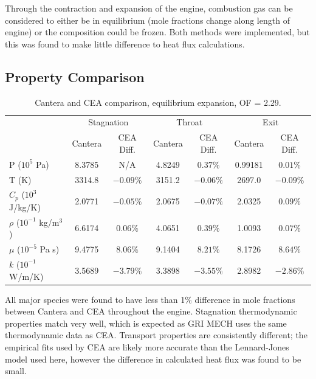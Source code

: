 \documentclass[11pt]{article}
\begin{document}
Through the contraction and expansion of the engine, combustion gas can be considered to either be in equilibrium (mole fractions change along length of engine) or the composition could be frozen. Both methods were implemented, but this was found to make little difference to heat flux calculations.


\subsection{Property Comparison}


\begin{table}[H]
  \centering
  \caption{Cantera and CEA comparison, equilibrium expansion, OF = 2.29.}
  \begin{tabular}{l c c c c c c}
    \toprule
    & \multicolumn{2}{c}{Stagnation} & \multicolumn{2}{c}{Throat} & \multicolumn{2}{c}{Exit} \\
    \cmidrule(lr){2-3} \cmidrule(lr){4-5} \cmidrule(lr){6-7}
    & Cantera & CEA Diff. & Cantera & CEA Diff. & Cantera & CEA Diff. \\
    \midrule
    P ($10^5$ Pa) & 8.3785 & N/A & 4.8249 & $0.37\%$ & 0.99181 & $0.01\%$ \\
    T (K) & 3314.8 & $-0.09\%$ & 3151.2 & $-0.06\%$ & 2697.0 & $-0.09\%$ \\
    $C_p$ ($10^3$ J/kg/K) & 2.0771 & $-0.05\%$ & 2.0675 & $-0.07\%$ & 2.0325 & $0.09\%$ \\
    $\rho$ ($10^{-1}$ kg/m$^3$) & 6.6174 & $0.06\%$ & 4.0651 & $0.39\%$ & 1.0093 & $0.07\%$\\
    $\mu$ ($10^{-5}$ Pa s) & 9.4775 & $8.06\%$ & 9.1404 & $8.21\%$ & 8.1726 & $8.64\%$ \\
    $k$ ($10^{-1}$ W/m/K) & 3.5689 & $-3.79\%$ & 3.3898 & $-3.55\%$ & 2.8982 & $-2.86\%$\\
    \bottomrule
  \end{tabular}
\end{table}

All major species were found to have less than 1\% difference in mole fractions between Cantera and CEA throughout the engine. Stagnation thermodynamic properties match very well, which is expected as GRI MECH uses the same thermodynamic data as CEA. Transport properties are consistently different; the empirical fits used by CEA are likely more accurate than the Lennard-Jones model used here, however the difference in calculated heat flux was found to be small.
\end{document}
